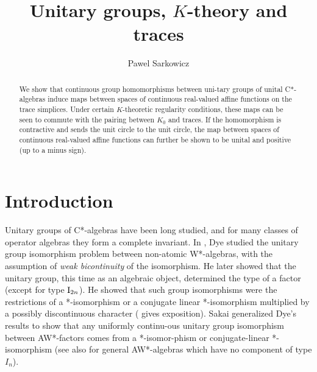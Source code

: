 \documentclass[12pt]{amsart}
\begin{document}
\title{Unitary groups, $K$-theory and traces}
\author{Pawel Sarkowicz}
\address{Department of Mathematics and Statistics, University of Ottawa, 75 Laurier Ave. East, Ottawa, ON, K1N 6N5 Canada}

  \begin{abstract}
    We show that continuous group homomorphisms between uni\hyp{}tary groups of unital C*-algebras induce maps between spaces of continuous real-valued affine functions on the trace simplices. Under certain $K$-theoretic regularity conditions, these maps can be seen to commute with the pairing between $K_0$ and traces. If the homomorphism is contractive and sends the unit circle to the unit circle, the map between spaces of continuous real-valued affine functions can further be shown to be unital and positive (up to a minus sign).
  \end{abstract}

  \maketitle
  \tableofcontents

  \section{Introduction}

  
\renewcommand*{\thetheorem}{\arabic{chapter}.\Alph{theorem}}
Unitary groups of C*-algebras have been long studied, and for many classes of operator algebras they form a complete invariant. In \cite{Dye53}, Dye studied the unitary group isomorphism problem between non-atomic W*-algebras, with the assumption of \emph{weak bicontinuity} of the isomorphism. He later showed that the unitary group, this time as an algebraic object, determined the type of a factor \cite{Dye55} (except for type $\text{I}_{2n}$). He showed that such group isomorphisms were the restrictions of a *-isomorphism or a conjugate linear *-isomorphism multiplied by a possibly discontinuous character (\cite[Appendix A]{Booth98} gives exposition). Sakai generalized Dye's results to show that any uniformly continu\hyp{}ous unitary group isomorphism between AW*-factors comes from a *-isomor\hyp{}phism or conjugate-linear *-isomorphism \cite{Sakai55} (see also \cite{Yen56} for general AW*-algebras which have no component of type $I_n$). 
\end{document}
